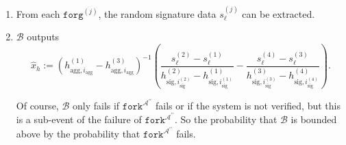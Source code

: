 \documentclass{mrl}
\theoremstyle{definition}
\numberwithin{theorem}{subsection}
\newcommand{\adversary}{\mathcal{A}}
\begin{document}
\begin{description}
\begin{enumerate}
\item From each $\texttt{forg}^{(j)}$, the random signature data $s_{\ell}^{(j)}$ can be extracted.

\item $\mathcal{B}$ outputs \[\widehat{x}_h := (h_{\text{agg}, i_{\text{agg}}}^{(1)} - h_{\text{agg}, i_{\text{agg}}}^{(3)})^{-1}\left(\frac{s_\ell^{(2)} - s_\ell^{(1)}}{h_{\text{sig}, i_{\text{sig}}^{(2)}}^{(2)} -h_{\text{sig}, i_{\text{sig}}^{(1)}}^{(1)}} -  \frac{s_\ell^{(4)} - s_\ell^{(3)}}{h_{\text{sig}, i_{\text{sig}}^{(3)}}^{(3)} -h_{\text{sig}, i_{\text{sig}}^{(4)}}^{(4)}}\right). \]

Of course, $\mathcal{B}$ only fails if $\texttt{fork}^{\adversary^{\prime \prime}}$ fails or if the system is not verified, but this is a sub-event of the failure of $\texttt{fork}^{\adversary^{\prime \prime}}$. So the probability that $\mathcal{B}$ is bounded above by the probability that $\texttt{fork}^{\adversary^{\prime \prime}}$ fails.

%
\end{enumerate}

\end{description}










\end{document}
